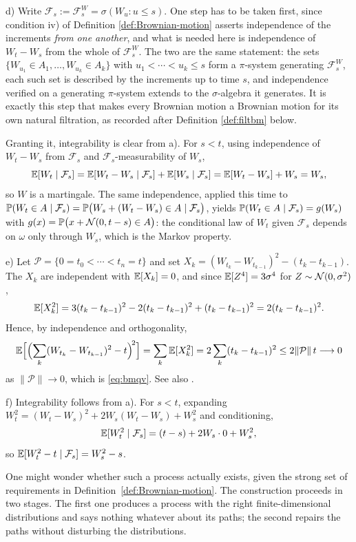 d) Write $\mathcal{F}_s := \mathcal{F}^W_s = \sigma(W_u : u \leq s)$. One step has to be taken
first, since condition iv) of Definition \ref{def:Brownian-motion} asserts independence of the
increments \emph{from one another}, and what is needed here is independence of $W_t - W_s$ from the
whole of $\mathcal{F}^W_s$. The two are the same statement: the sets
$\{W_{u_1}\in A_1,\dots,W_{u_k}\in A_k\}$ with $u_1<\cdots<u_k\leq s$ form a $\pi$-system generating
$\mathcal{F}^W_s$, each such set is described by the increments up to time $s$, and independence
verified on a generating $\pi$-system extends to the $\sigma$-algebra it generates. It is exactly
this step that makes every Brownian motion a Brownian motion for its own natural filtration, as
recorded after Definition \ref{def:filtbm} below.

Granting it, integrability is clear from a). For $s<t$, using independence of $W_t-W_s$ from $\mathcal{F}_s$
and $\mathcal{F}_s$-measurability of $W_s$,
\[
\mathbb{E}[W_t \mid \mathcal{F}_s] = \mathbb{E}[W_t - W_s \mid \mathcal{F}_s] + \mathbb{E}[W_s\mid\mathcal{F}_s]
= \mathbb{E}[W_t-W_s] + W_s = W_s,
\]
so $W$ is a martingale. The same independence, applied this time to
$\mathbb{P}(W_t \in A \mid \mathcal{F}_s) = \mathbb{P}\bigl(W_s + (W_t-W_s) \in A \mid \mathcal{F}_s\bigr)$,
yields $\mathbb{P}(W_t \in A \mid \mathcal{F}_s) = g(W_s)$ with
$g(x) = \mathbb{P}\bigl(x + \mathcal{N}(0,t-s) \in A\bigr)$: the conditional law of $W_t$ given
$\mathcal{F}_s$ depends on $\omega$ only through $W_s$, which is the Markov property.

e) Let $\mathcal{P}=\{0=t_0<\cdots<t_n=t\}$ and set
$X_k = (W_{t_k}-W_{t_{k-1}})^2 - (t_k - t_{k-1})$. The $X_k$ are independent with
$\mathbb{E}[X_k]=0$, and since $\mathbb{E}[Z^4]=3\sigma^4$ for $Z\sim\mathcal{N}(0,\sigma^2)$,
\[
\mathbb{E}[X_k^2] = 3(t_k-t_{k-1})^2 - 2(t_k-t_{k-1})^2 + (t_k-t_{k-1})^2 = 2(t_k-t_{k-1})^2 .
\]
Hence, by independence and orthogonality,
\[
\mathbb{E}\Bigl[\Bigl(\sum_k (W_{t_k}-W_{t_{k-1}})^2 - t\Bigr)^{\!2}\Bigr]
= \sum_k \mathbb{E}[X_k^2] = 2\sum_k (t_k-t_{k-1})^2 \leq 2\lVert\mathcal{P}\rVert\,t \longrightarrow 0
\]
as $\lVert\mathcal{P}\rVert \to 0$, which is \eqref{eq:bmqv}. See also \cite[Thm.\ 4.1.2]{kuo2006}.

f) Integrability follows from a). For $s<t$, expanding $W_t^2 = (W_t-W_s)^2 + 2W_s(W_t-W_s) + W_s^2$
and conditioning,
\[
\mathbb{E}[W_t^2 \mid \mathcal{F}_s] = (t-s) + 2W_s\cdot 0 + W_s^2,
\]
so $\mathbb{E}[W_t^2 - t \mid \mathcal{F}_s] = W_s^2 - s$. \qedfilledtext

\medskip

One might wonder whether such a process actually exists, given the strong 
set of requirements in Definition~\ref{def:Brownian-motion}.  The construction proceeds in two stages. The 
first one produces a process with the right finite-dimensional distributions and says nothing 
whatever about its paths; the second repairs the paths without disturbing the distributions.

